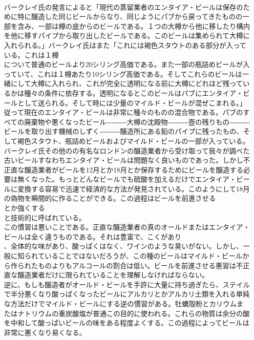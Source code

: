 \documentclass[8pt]{extreport}
\begin{document}
\begin{CJK}{UTF8}{min}
\\	バークレイ氏の発言によると「現代の蒸留業者のエンタイア・ビールは保存のために特に醸造した同じビールからなり、同じようにパブから戻ってきたものの一部を含み、一部は樽の底からのビールである。１つの大樽から他に移したり構内を他に移すパイプから取り出したビールである。このビールは集められて大樽に入れられる。」バークレイ氏はまた「これには褐色スタウトのある部分が入っている。これは１樽
\\	について普通のビールより20シリング高価である。また一部の瓶詰めビールが入っていて、これは１樽あたり10シリング高価である。そしてこれらのビールは一緒にして大樽に入れられ、これが完全に透明になる前に大樽にどれほど残っているかは種々の条件に依存する。透明になるとこのビールはパブにエンタイア・ビールとして送られる。そして時には少量のマイルド・ビールが混ぜこまれる。」
\\	従って現在のエンタイア・ビールは非常に種々のものの混合物である。パブのすべての廃棄物や悪くなったビール―――大樽の沈殿物―――壺の残りもの―――ビールを取り出す機械のしずく―――醸造所にある鉛のパイプに残ったもの、そして褐色スタウト、瓶詰めビールおよびマイルド・ビールの一部が入っている。
\\	バークレイ氏その他のの有名なロンドンの醸造業者から受け取って我々が調べた古いビールすなわちエンタイア・ビールは問題なく良いものであった。しかし不正直な醸造業者がビールを12月とか18月とか保存するためにビールを醸造する必要は無くなった。もっとどんなビールでも硫酸を加えるだけでエンタイア・ビールに変換する容易で迅速で経済的な方法が発見されている。このようにして18月の偽物を瞬間的に作ることができる。この過程はビールを前進させる
\\	とか強くする
\\	と技術的に呼ばれている。
\\	この慣習は悪いことである。正直な醸造業者の真のオールドまたはエンタイア・ビールは全く違うものである。それは豊富で、こくがあり
\\	、全体的な味があり、酸っぱくはなく、ワインのような臭いがない。しかし、一般に知られていることではないだろうが、この種のビールはマイルド・ビールから作られたものよりもアルコールの割合は低い。ビールを前進させる悪習は不正直な醸造業者だけに限られていることを理解しなければならない。
\\	逆に、もしも醸造者がオールド・ビールを手許に大量に持ち過ぎたら、ステイルで半分悪くなり酸っぱくなったビールにアルカリとかアルカリ土類を入れる単純な方法だけでマイルド・ビールにする逆の慣習がある。牡蠣殻粉とカリウムまたはナトリウムの重炭酸塩が普通この目的に使われる。これらの物質は余分の酸を中和して酸っぱいビールの味をある程度よくする。この過程によってビールは非常に悪くなり易くなる。

\end{CJK}
\end{document}
